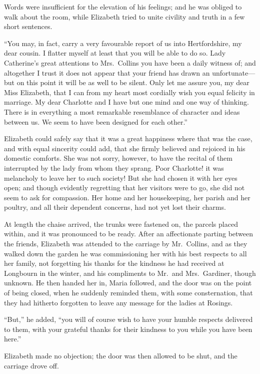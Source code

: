 \documentclass[12pt,english]{book}
\begin{document}
Words were insufficient for the elevation of his feelings; and he
was obliged to walk about the room, while Elizabeth tried to unite
civility and truth in a few short sentences.

{}``You may, in fact, carry a very favourable report of us into Hertfordshire,
my dear cousin. I flatter myself at least that you will be able to
do so. Lady Catherine's great attentions to Mrs.\ Collins you have
been a daily witness of; and altogether I trust it does not appear
that your friend has drawn an unfortunate\mbox{---}but on this point
it will be as well to be silent. Only let me assure you, my dear Miss
Elizabeth, that I can from my heart most cordially wish you equal
felicity in marriage. My dear Charlotte and I have but one mind and
one way of thinking. There is in everything a most remarkable resemblance
of character and ideas between us. We seem to have been designed for
each other.''

Elizabeth could safely say that it was a great happiness where that
was the case, and with equal sincerity could add, that she firmly
believed and rejoiced in his domestic comforts. She was not sorry,
however, to have the recital of them interrupted by the lady from
whom they sprang. Poor Charlotte! it was melancholy to leave her to
such society! But she had chosen it with her eyes open; and though
evidently regretting that her visitors were to go, she did not seem
to ask for compassion. Her home and her housekeeping, her parish and
her poultry, and all their dependent concerns, had not yet lost their
charms.

At length the chaise arrived, the trunks were fastened on, the parcels
placed within, and it was pronounced to be ready. After an affectionate
parting between the friends, Elizabeth was attended to the carriage
by Mr.\ Collins, and as they walked down the garden he was commissioning
her with his best respects to all her family, not forgetting his thanks
for the kindness he had received at Longbourn in the winter, and his
compliments to Mr.\ and Mrs.\ Gardiner, though unknown. He then
handed her in, Maria followed, and the door was on the point of being
closed, when he suddenly reminded them, with some consternation, that
they had hitherto forgotten to leave any message for the ladies at
Rosings.

{}``But,'' he added, {}``you will of course wish to have your humble
respects delivered to them, with your grateful thanks for their kindness
to you while you have been here.''

Elizabeth made no objection; the door was then allowed to be shut,
and the carriage drove off.
\end{document}
